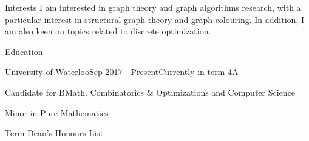 \documentclass{cv}
\begin{document}
\begin{rSection}{Interests}
	I am interested in graph theory and graph algorithms research, with a particular interest in structural graph theory and graph colouring. In addition, I am also keen on topics related to discrete optimization.
\end{rSection}

\begin{rSection}{Education}

\begin{rSubsection}{University of Waterloo}{Sep 2017 - Present}{Currently in term 4A}{}
	\item Candidate for BMath. Combinatorics \& Optimizations and Computer Science
	\item Minor in Pure Mathematics
	\item Term Dean's Honours List
\end{rSubsection}



\end{rSection}
\end{document}
